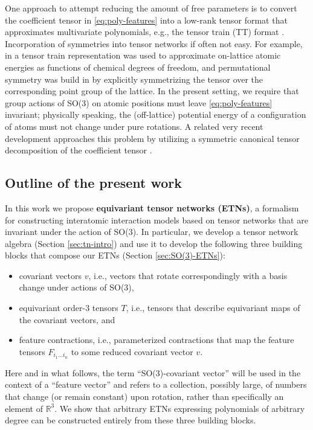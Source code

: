 One approach to attempt reducing the amount of free parameters is to convert the coefficient tensor in \eqref{eq:poly-features} into a low-rank tensor format that approximates multivariate polynomials, e.g., the tensor train (TT) format \citep{oseledets_tensortrain_2011,cichocki_tensor_2017}.
Incorporation of symmetries into tensor networks if often not easy.
For example, in \citep{kostiuchenko2019-npj} a tensor train representation was used to approximate on-lattice atomic energies as functions of chemical degrees of freedom, and permutational symmetry was build in by explicitly symmetrizing the tensor over the corresponding point group of the lattice.
In the present setting, we require that group actions of SO(3) on atomic positions must leave \eqref{eq:poly-features} invariant; physically speaking, the (off-lattice) potential energy of a configuration of atoms must not change under pure rotations.
A related very recent development approaches this problem by utilizing a symmetric canonical tensor decomposition of the coefficient tensor \citep{jana_searching_2023}.

\subsection{Outline of the present work}

In this work we propose \textbf{equivariant tensor networks (ETNs)}, a formalism for constructing interatomic interaction models based on tensor networks that are invariant under the action of SO(3).
In particular, we develop a tensor network algebra (Section \ref{sec:tn-intro}) and use it to develop the following three building blocks that compose our ETNs (Section \ref{sec:SO(3)-ETNs}):
\begin{itemize}
    \item
    covariant vectors $v$, i.e., vectors that rotate correspondingly with a basis change under actions of SO(3),
    \item
    equivariant order-3 tensors $T$, i.e., tensors that describe equivariant maps of the covariant vectors, and
    \item
    feature contractions, i.e., parameterized contractions that map the feature tensors $F_{i_1 \ldots i_n}$ to some reduced covariant vector $v$.
\end{itemize}
Here and in what follows, the term ``SO(3)-covariant vector'' will be used in the context of a ``feature vector'' and refers to a collection, possibly large, of numbers that change (or remain constant) upon rotation, rather than specifically an element of $\mathbb{R}^3$.
We show that arbitrary ETNs expressing polynomials of arbitrary degree can be constructed entirely from these three building blocks.

